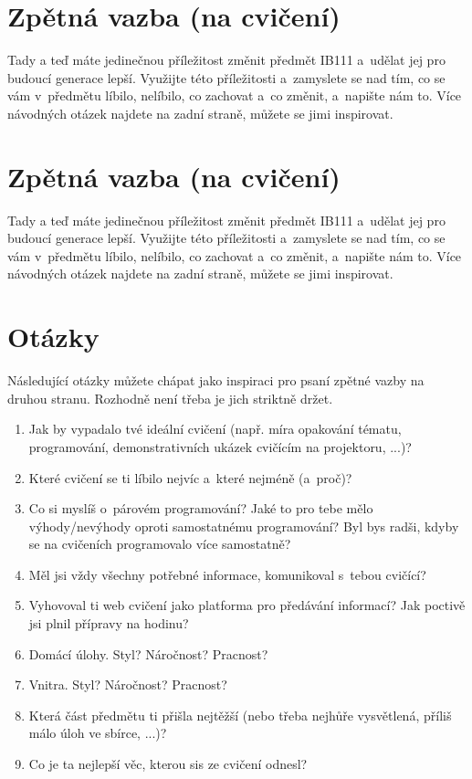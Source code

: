 \documentclass[12pt,a5paper]{article}
\begin{document}
\pagestyle{empty}

\section*{Zpětná vazba (na cvičení)}
Tady a teď máte jedinečnou příležitost změnit předmět IB111 a~udělat jej pro
budoucí generace lepší. Využijte této příležitosti a~zamyslete se nad tím, co
se vám v~předmětu líbilo, nelíbilo, co zachovat a~co změnit, a~napište nám to.
Více návodných otázek najdete na zadní straně, můžete se jimi inspirovat.

\newpage

\section*{Zpětná vazba (na cvičení)}
Tady a teď máte jedinečnou příležitost změnit předmět IB111 a~udělat jej pro
budoucí generace lepší. Využijte této příležitosti a~zamyslete se nad tím, co
se vám v~předmětu líbilo, nelíbilo, co zachovat a~co změnit, a~napište nám to.
Více návodných otázek najdete na zadní straně, můžete se jimi inspirovat.

\newpage

\section*{Otázky}

Následující otázky můžete chápat jako inspiraci pro psaní zpětné vazby na
druhou stranu. Rozhodně není třeba je jich striktně držet.

\begin{enumerate}
	\item Jak by vypadalo tvé ideální cvičení (např. míra opakování tématu,
		  programování, demonstrativních ukázek cvičícím na projektoru, ...)?
	\item Které cvičení se ti líbilo nejvíc a~které nejméně (a~proč)?
	\item Co si myslíš o~párovém programování? Jaké to pro tebe mělo
		  výhody/nevýhody oproti samostatnému programování? Byl bys radši,
		  kdyby se na cvičeních programovalo více samostatně?
	\item Měl jsi vždy všechny potřebné informace, komunikoval s~tebou cvičící?
	\item Vyhovoval ti web cvičení jako platforma pro předávání informací?
		  Jak poctivě jsi plnil přípravy na hodinu?
	\item Domácí úlohy. Styl? Náročnost? Pracnost?
	\item Vnitra. Styl? Náročnost? Pracnost?
	\item Která část předmětu ti přišla nejtěžší (nebo třeba nejhůře
	      vysvětlená, příliš málo úloh ve sbírce, ...)?
	\item Co je ta nejlepší věc, kterou sis ze cvičení odnesl?
\end{enumerate}
\end{document}

